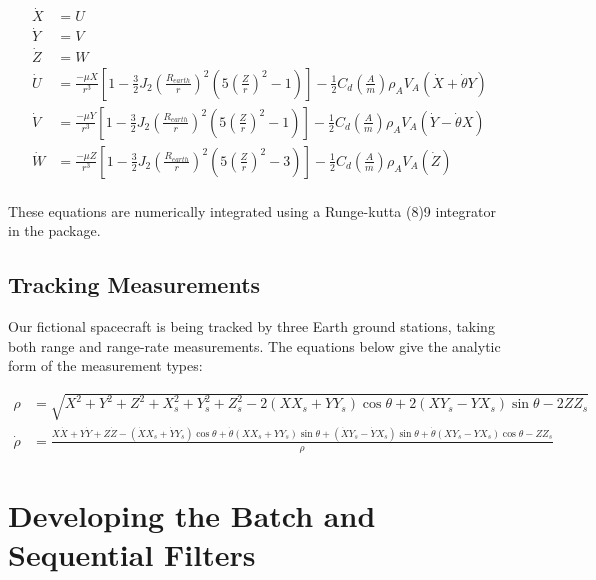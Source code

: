 \documentclass[10pt]{article}
\begin{document}
\begin{equation}
\begin{split}
\dot{X}  & = U \\
\dot{Y}  & = V \\
\dot{Z}  & = W \\
\dot{U} & = \frac{-\mu X}{r^3}\left[ 1 - \frac{3}{2}J_2\left(\frac{R_{earth}}{r}\right)^2 \left(5 \left(\frac{Z}{r}\right)^2 - 1 \right)\right]  -  \frac{1}{2} C_d \left( \frac{A}{m}\right) \rho_A V_A ( \dot{X} +  \dot{\theta}Y)\\
\dot{V} & = \frac{-\mu Y}{r^3}\left[ 1 - \frac{3}{2}J_2\left(\frac{R_{earth}}{r}\right)^2 \left(5 \left(\frac{Z}{r}\right)^2 - 1 \right)\right]  -  \frac{1}{2} C_d \left( \frac{A}{m}\right) \rho_A V_A (\dot{Y} -  \dot{\theta}X) \\
\dot{W} & = \frac{-\mu Z}{r^3}\left[ 1 - \frac{3}{2}J_2\left(\frac{R_{earth}}{r}\right)^2 \left(5 \left(\frac{Z}{r}\right)^2 - 3 \right)\right] -  \frac{1}{2} C_d \left( \frac{A}{m}\right) \rho_A V_A ( \dot{Z}) \\
\end{split}
\end{equation}

These equations are numerically integrated using a Runge-kutta (8)9 integrator in the package. 

\subsection{Tracking Measurements}

Our fictional spacecraft is being tracked by three Earth ground stations, taking both range and range-rate measurements. The equations below give the analytic form of the measurement types:

\begin{equation}
\begin{split}
\rho  & = \sqrt{X^2 + Y^2 + Z^2 + X_s^2 + Y_s^2 + Z_s^2 - 2 (X  X_s + Y  Y_s )\cos{\theta} + 2( X Y_s - Y X_s)\sin{\theta} - 2 Z Z_s}  \\
\dot{\rho} & = \frac{X \dot{X} + Y \dot{Y} + Z \dot{Z} - (\dot{X} X_s + \dot{Y} Y_s ) \cos{\theta} + \dot{\theta} (X X_s + Y Y_s) \sin{\theta} + (\dot{X} Y_s - \dot{Y} X_s) \sin{\theta} + \dot{\theta} (X Y_s - Y X_s) \cos{\theta} - Z Z_s}{\rho}
\end{split}
\end{equation}


\section{Developing the Batch and Sequential Filters}
\end{document}
